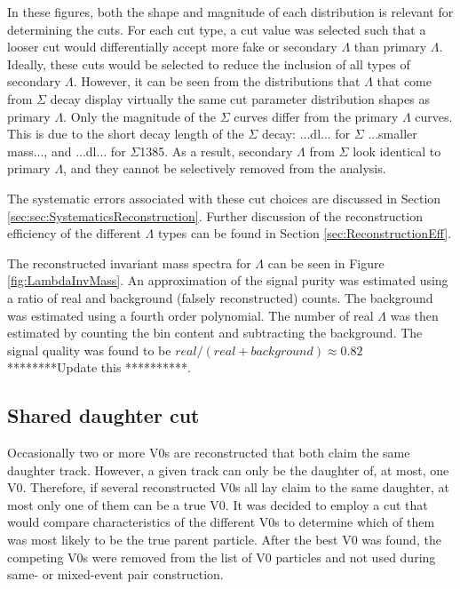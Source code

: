 In these figures, both the shape and magnitude of each distribution is relevant for determining the cuts. For each cut type, a cut value was selected such that a looser cut would differentially accept more fake or secondary $\Lambda$ than primary $\Lambda$. Ideally, these cuts would be selected to reduce the inclusion of all types of secondary $\Lambda$.  However, it can be seen from the distributions that $\Lambda$ that come from $\Sigma$ decay display virtually the same cut parameter distribution shapes as primary $\Lambda$.  Only the magnitude of the $\Sigma$ curves differ from the primary $\Lambda$ curves.  This is due to the short decay length of the $\Sigma$ decay: ...dl... for $\Sigma$ ...smaller mass..., and ...dl... for $\Sigma$1385. As a result, secondary $\Lambda$ from $\Sigma$ look identical to primary $\Lambda$, and they cannot be selectively removed from the analysis.

The systematic errors associated with these cut choices are discussed in Section \ref{sec:sec:SystematicsReconstruction}. Further discussion of the reconstruction efficiency of the different $\Lambda$ types can be found in Section \ref{sec:ReconstructionEff}.

The reconstructed invariant mass spectra for $\Lambda$ can be seen in Figure \ref{fig:LambdaInvMass}. An approximation of the signal purity was estimated using a ratio of real and background (falsely reconstructed) counts.  The background was estimated using a fourth order polynomial.  The number of real $\Lambda$ was then estimated by counting the bin content and subtracting the background. The signal quality was found to be $real/(real + background) \approx 0.82$ ********Update this **********.


\subsection{Shared daughter cut}

Occasionally two or more V0s are reconstructed that both claim the same daughter track.  However, a given track can only be the daughter of, at most, one V0.  Therefore, if several reconstructed V0s all lay claim to the same daughter, at most only one of them can be a true V0.  It was decided to employ a cut that would compare characteristics of the different V0s to determine which of them was most likely to be the true parent particle.  After the best V0 was found, the competing V0s were removed from the list of V0 particles and not used during same- or mixed-event pair construction.

